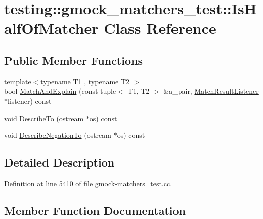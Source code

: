 \hypertarget{classtesting_1_1gmock__matchers__test_1_1_is_half_of_matcher}{}\section{testing\+:\+:gmock\+\_\+matchers\+\_\+test\+:\+:Is\+Half\+Of\+Matcher Class Reference}
\label{classtesting_1_1gmock__matchers__test_1_1_is_half_of_matcher}
\subsection*{Public Member Functions}
\begin{DoxyCompactItemize}
\item 
{\footnotesize template$<$typename T1 , typename T2 $>$ }\\bool \hyperlink{classtesting_1_1gmock__matchers__test_1_1_is_half_of_matcher_a41ccf5c44ea517c1c2aeeca852231c4d}{Match\+And\+Explain} (const tuple$<$ T1, T2 $>$ \&a\+\_\+pair, \hyperlink{classtesting_1_1_match_result_listener}{Match\+Result\+Listener} $\ast$listener) const 
\item 
void \hyperlink{classtesting_1_1gmock__matchers__test_1_1_is_half_of_matcher_a408f336da6ee31c6b17ed230b684e22d}{Describe\+To} (ostream $\ast$os) const 
\item 
void \hyperlink{classtesting_1_1gmock__matchers__test_1_1_is_half_of_matcher_ae4779c3d127d9ee348c8019020d073e8}{Describe\+Negation\+To} (ostream $\ast$os) const 
\end{DoxyCompactItemize}


\subsection{Detailed Description}


Definition at line 5410 of file gmock-\/matchers\+\_\+test.\+cc.



\subsection{Member Function Documentation}
